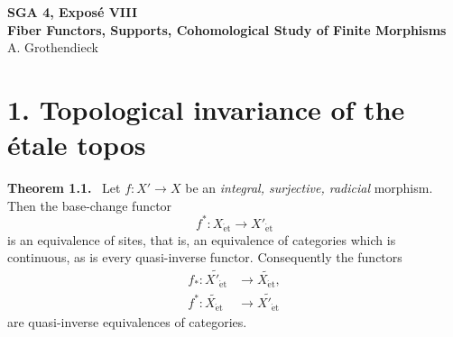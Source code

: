 \documentclass[11pt]{article}
\newcommand{\et}{\mathrm{\acute{e}t}}
\newenvironment{statement}[1]{\par\medskip\noindent\textbf{#1.}\ }{\par\medskip}
\begin{document}

\begin{center}
{\Large \textbf{SGA 4, Expos\'e VIII}}\\[0.35em]
{\large \textbf{Fiber Functors, Supports, Cohomological Study of Finite Morphisms}}\\[0.25em]
{\normalsize A. Grothendieck}
\end{center}

\bigskip

\section*{1. Topological invariance of the \'etale topos}

\begin{statement}{Theorem 1.1}
Let \(f:X'\to X\) be an \emph{integral, surjective, radicial} morphism. Then the base-change functor
\[
f^*:X_{\et}\longrightarrow X'_{\et}
\]
is an equivalence of sites, that is, an equivalence of categories which is continuous, as is every quasi-inverse functor. Consequently the functors
\[
\begin{aligned}
f_*:\widetilde{X'_{\et}}&\longrightarrow \widetilde{X_{\et}},\\
f^*:\widetilde{X_{\et}}&\longrightarrow \widetilde{X'_{\et}}
\end{aligned}
\]
are quasi-inverse equivalences of categories.
\end{statement}
\end{document}
